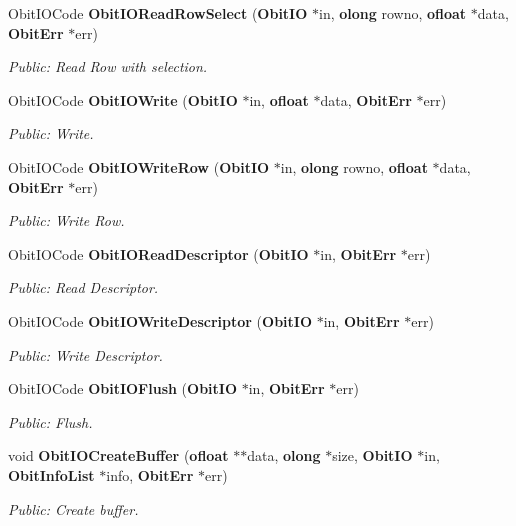 \begin{CompactItemize}
Obit\-IOCode {\bf Obit\-IORead\-Row\-Select} ({\bf Obit\-IO} $\ast$in, {\bf olong} rowno, {\bf ofloat} $\ast$data, {\bf Obit\-Err} $\ast$err)
\begin{CompactList}\small\item\em Public: Read Row with selection. \item\end{CompactList}\item 
Obit\-IOCode {\bf Obit\-IOWrite} ({\bf Obit\-IO} $\ast$in, {\bf ofloat} $\ast$data, {\bf Obit\-Err} $\ast$err)
\begin{CompactList}\small\item\em Public: Write. \item\end{CompactList}\item 
Obit\-IOCode {\bf Obit\-IOWrite\-Row} ({\bf Obit\-IO} $\ast$in, {\bf olong} rowno, {\bf ofloat} $\ast$data, {\bf Obit\-Err} $\ast$err)
\begin{CompactList}\small\item\em Public: Write Row. \item\end{CompactList}\item 
Obit\-IOCode {\bf Obit\-IORead\-Descriptor} ({\bf Obit\-IO} $\ast$in, {\bf Obit\-Err} $\ast$err)
\begin{CompactList}\small\item\em Public: Read Descriptor. \item\end{CompactList}\item 
Obit\-IOCode {\bf Obit\-IOWrite\-Descriptor} ({\bf Obit\-IO} $\ast$in, {\bf Obit\-Err} $\ast$err)
\begin{CompactList}\small\item\em Public: Write Descriptor. \item\end{CompactList}\item 
Obit\-IOCode {\bf Obit\-IOFlush} ({\bf Obit\-IO} $\ast$in, {\bf Obit\-Err} $\ast$err)
\begin{CompactList}\small\item\em Public: Flush. \item\end{CompactList}\item 
void {\bf Obit\-IOCreate\-Buffer} ({\bf ofloat} $\ast$$\ast$data, {\bf olong} $\ast$size, {\bf Obit\-IO} $\ast$in, {\bf Obit\-Info\-List} $\ast$info, {\bf Obit\-Err} $\ast$err)
\begin{CompactList}\small\item\em Public: Create buffer. \item\end{CompactList}\item 
$$
\end{CompactItemize}
